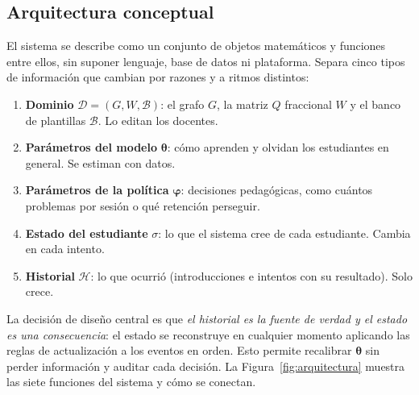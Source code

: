 \documentclass[12pt]{article}
\theoremstyle{definition}
\newcommand{\Hist}{\mathcal H}
\newcommand{\Dom}{\mathcal D}
\newcommand{\Banco}{\mathcal B}
\begin{document}
\subsection{Arquitectura conceptual}

El sistema se describe como un conjunto de objetos matemáticos y funciones entre ellos, sin suponer lenguaje, base de datos ni plataforma. Separa cinco tipos de información que cambian por razones y a ritmos distintos:

\begin{enumerate}
\item \textbf{Dominio} $\Dom=(G,W,\Banco)$: el grafo $G$, la matriz $Q$ fraccional $W$ y el banco de plantillas $\Banco$. Lo editan los docentes.
\item \textbf{Parámetros del modelo} $\bm\theta$: cómo aprenden y olvidan los estudiantes en general. Se estiman con datos.
\item \textbf{Parámetros de la política} $\bm\varphi$: decisiones pedagógicas, como cuántos problemas por sesión o qué retención perseguir.
\item \textbf{Estado del estudiante} $\sigma$: lo que el sistema cree de cada estudiante. Cambia en cada intento.
\item \textbf{Historial} $\Hist$: lo que ocurrió (introducciones e intentos con su resultado). Solo crece.
\end{enumerate}

La decisión de diseño central es que \emph{el historial es la fuente de verdad y el estado es una consecuencia}: el estado se reconstruye en cualquier momento aplicando las reglas de actualización a los eventos en orden. Esto permite recalibrar $\bm\theta$ sin perder información y auditar cada decisión. La Figura~\ref{fig:arquitectura} muestra las siete funciones del sistema y cómo se conectan.
\end{document}
